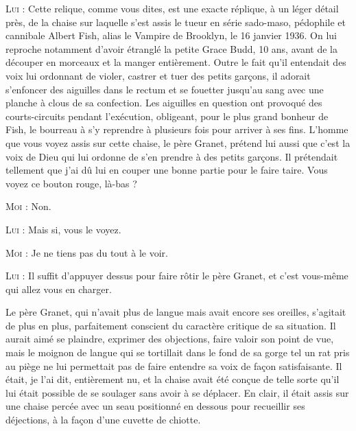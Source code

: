 \textsc{Lui} : Cette relique, comme vous dites, est une exacte réplique, à un léger détail près, de la chaise sur laquelle s’est assis le tueur en série sado-maso, pédophile et cannibale Albert Fish, alias le Vampire de Brooklyn, le 16 janvier 1936. On lui reproche notamment d’avoir étranglé la petite Grace Budd, 10 ans, avant de la découper en morceaux et la manger entièrement. Outre le fait qu’il entendait des voix lui ordonnant de violer, castrer et tuer des petits garçons, il adorait s’enfoncer des aiguilles dans le rectum et se fouetter jusqu’au sang avec une planche à clous de sa confection. Les aiguilles en question ont provoqué des courts-circuits pendant l’exécution, obligeant, pour le plus grand bonheur de Fish, le bourreau à s’y reprendre à plusieurs fois pour arriver à ses fins. L’homme que vous voyez assis sur cette chaise, le père Granet, prétend lui aussi que c’est la voix de Dieu qui lui ordonne de s’en prendre à des petits garçons. Il prétendait tellement que j’ai dû lui en couper une bonne partie pour le faire taire. Vous voyez ce bouton rouge, là-bas ?

\textsc{Moi} : Non.

\textsc{Lui} : Mais si, vous le voyez.

\textsc{Moi} : Je ne tiens pas du tout à le voir.

\textsc{Lui} : Il suffit d’appuyer dessus pour faire rôtir le père Granet, et c’est vous-même qui allez vous en charger.

Le père Granet, qui n’avait plus de langue mais avait encore ses oreilles, s’agitait de plus en plus, parfaitement conscient du caractère critique de sa situation. Il aurait aimé se plaindre, exprimer des objections, faire valoir son point de vue, mais le moignon de langue qui se tortillait dans le fond de sa gorge tel un rat pris au piège ne lui permettait pas de faire entendre sa voix de façon satisfaisante. Il était, je l’ai dit, entièrement nu, et la chaise avait été conçue de telle sorte qu’il lui était possible de se soulager sans avoir à se déplacer. En clair, il était assis sur une chaise percée avec un seau positionné en dessous pour recueillir ses déjections, à la façon d’une cuvette de chiotte.

